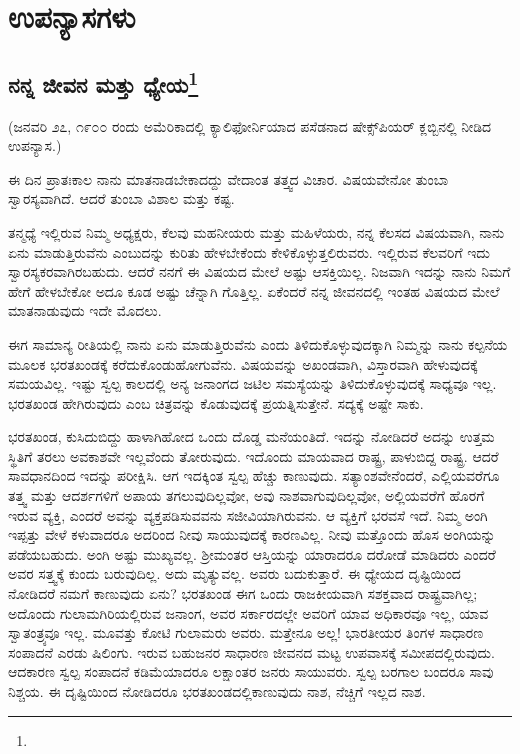 

\part{ಉಪನ್ಯಾಸಗಳು}

\chapter[ನನ್ನ ಜೀವನ ಮತ್ತು ಧ್ಯೇಯ]{ನನ್ನ ಜೀವನ ಮತ್ತು ಧ್ಯೇಯ\protect\footnote{}}

\begin{center}
(ಜನವರಿ ೨೭, ೧೯೦೦ ರಂದು ಅಮೆರಿಕಾದಲ್ಲಿ ಕ್ಯಾಲಿಫೋರ್ನಿಯಾದ ಪಸೆಡನಾದ ಷೇಕ್ಸ್‌ಪಿಯರ್ ಕ್ಲಬ್ಬಿನಲ್ಲಿ ನೀಡಿದ ಉಪನ್ಯಾಸ.)
\end{center}

ಈ ದಿನ ಪ್ರಾತಃಕಾಲ ನಾನು ಮಾತನಾಡಬೇಕಾದದ್ದು ವೇದಾಂತ ತತ್ತ್ವದ ವಿಚಾರ. ವಿಷಯವೇನೋ ತುಂಬಾ ಸ್ವಾರಸ್ಯವಾಗಿದೆ. ಆದರೆ ತುಂಬಾ ವಿಶಾಲ ಮತ್ತು ಕಷ್ಟ.

ತನ್ಮಧ್ಯೆ ಇಲ್ಲಿರುವ ನಿಮ್ಮ ಅಧ್ಯಕ್ಷರು, ಕೆಲವು ಮಹನೀಯರು ಮತ್ತು ಮಹಿಳೆಯರು, ನನ್ನ ಕೆಲಸದ ವಿಷಯವಾಗಿ, ನಾನು ಏನು ಮಾಡುತ್ತಿರುವೆನು ಎಂಬುದನ್ನು ಕುರಿತು ಹೇಳಬೇಕೆಂದು ಕೇಳಿಕೊಳ್ಳುತ್ತಲಿರುವರು. ಇಲ್ಲಿರುವ ಕೆಲವರಿಗೆ ಇದು ಸ್ವಾರಸ್ಯಕರವಾಗಿರಬಹುದು. ಆದರೆ ನನಗೆ ಈ ವಿಷಯದ ಮೇಲೆ ಅಷ್ಟು ಆಸಕ್ತಿಯಿಲ್ಲ. ನಿಜವಾಗಿ ಇದನ್ನು ನಾನು ನಿಮಗೆ ಹೇಗೆ ಹೇಳಬೇಕೋ ಅದೂ ಕೂಡ ಅಷ್ಟು ಚೆನ್ನಾಗಿ ಗೊತ್ತಿಲ್ಲ. ಏಕೆಂದರೆ ನನ್ನ ಜೀವನದಲ್ಲಿ ಇಂತಹ ವಿಷಯದ ಮೇಲೆ ಮಾತನಾಡುವುದು ಇದೇ ಮೊದಲು.

ಈಗ ಸಾಮಾನ್ಯ ರೀತಿಯಲ್ಲಿ ನಾನು ಏನು ಮಾಡುತ್ತಿರುವೆನು ಎಂದು ತಿಳಿದುಕೊಳ್ಳುವುದಕ್ಕಾಗಿ ನಿಮ್ಮನ್ನು ನಾನು ಕಲ್ಪನೆಯ ಮೂಲಕ ಭರತಖಂಡಕ್ಕೆ ಕರೆದುಕೊಂಡು\break ಹೋಗುವೆನು. ವಿಷಯವನ್ನು ಅಖಂಡವಾಗಿ, ವಿಸ್ತಾರವಾಗಿ ಹೇಳುವುದಕ್ಕೆ ಸಮಯವಿಲ್ಲ. ಇಷ್ಟು ಸ್ವಲ್ಪ ಕಾಲದಲ್ಲಿ ಅನ್ಯ ಜನಾಂಗದ ಜಟಿಲ ಸಮಸ್ಯೆಯನ್ನು ತಿಳಿದುಕೊಳ್ಳುವುದಕ್ಕೆ ಸಾಧ್ಯವೂ ಇಲ್ಲ. ಭರತಖಂಡ ಹೇಗಿರುವುದು ಎಂಬ ಚಿತ್ರವನ್ನು ಕೊಡುವುದಕ್ಕೆ ಪ್ರಯತ್ನಿಸುತ್ತೇನೆ. ಸದ್ಯಕ್ಕೆ ಅಷ್ಟೇ ಸಾಕು.

ಭರತಖಂಡ, ಕುಸಿದುಬಿದ್ದು ಹಾಳಾಗಿಹೋದ ಒಂದು ದೊಡ್ಡ ಮನೆಯಂತಿದೆ. ಇದನ್ನು ನೋಡಿದರೆ ಅದನ್ನು ಉತ್ತಮ ಸ್ಥಿತಿಗೆ ತರಲು ಅವಕಾಶವೇ ಇಲ್ಲವೆಂದು ತೋರುವುದು. ಇದೊಂದು ಮಾಯವಾದ ರಾಷ್ಟ್ರ, ಪಾಳುಬಿದ್ದ ರಾಷ್ಟ್ರ. ಆದರೆ ಸಾವಧಾನದಿಂದ ಇದನ್ನು ಪರೀಕ್ಷಿಸಿ. ಆಗ ಇದಕ್ಕಿಂತ ಸ್ವಲ್ಪ ಹೆಚ್ಚು ಕಾಣುವುದು. ಸತ್ಯಾಂಶವೇನೆಂದರೆ, ಎಲ್ಲಿಯವರೆಗೂ ತತ್ತ್ವ ಮತ್ತು ಆದರ್ಶಗಳಿಗೆ ಅಪಾಯ ತಗಲುವುದಿಲ್ಲವೋ, ಅವು ನಾಶವಾಗುವುದಿಲ್ಲವೋ, ಅಲ್ಲಿಯವರೆಗೆ ಹೊರಗೆ ಇರುವ ವ್ಯಕ್ತಿ, ಎಂದರೆ ಅವನ್ನು ವ್ಯಕ್ತಪಡಿಸುವವನು ಸಜೀವಿಯಾಗಿರುವನು. ಆ ವ್ಯಕ್ತಿಗೆ ಭರವಸೆ ಇದೆ. ನಿಮ್ಮ ಅಂಗಿ ಇಪ್ಪತ್ತು ವೇಳೆ ಕಳುವಾದರೂ ಅದರಿಂದ ನೀವು ಸಾಯುವುದಕ್ಕೆ ಕಾರಣವಿಲ್ಲ. ನೀವು ಮತ್ತೊಂದು ಹೊಸ ಅಂಗಿಯನ್ನು ಪಡೆಯಬಹುದು. ಅಂಗಿ ಅಷ್ಟು ಮುಖ್ಯವಲ್ಲ. ಶ‍್ರೀಮಂತರ ಆಸ್ತಿಯನ್ನು ಯಾರಾದರೂ ದರೋಡೆ ಮಾಡಿದರು ಎಂದರೆ ಅವರ ಸತ್ತ್ವಕ್ಕೆ ಕುಂದು ಬರುವುದಿಲ್ಲ. ಅದು ಮೃತ್ಯುವಲ್ಲ. ಅವರು ಬದುಕುತ್ತಾರೆ. ಈ ಧ್ಯೇಯದ ದೃಷ್ಟಿಯಿಂದ ನೋಡಿದರೆ ನಮಗೆ ಕಾಣುವುದು ಏನು? ಭರತಖಂಡ ಈಗ ಒಂದು ರಾಜಕೀಯವಾಗಿ ಸಶಕ್ತವಾದ ರಾಷ್ಟ್ರವಾಗಿಲ್ಲ; ಅದೊಂದು ಗುಲಾಮಗಿರಿಯಲ್ಲಿರುವ ಜನಾಂಗ, ಅವರ ಸರ್ಕಾರದಲ್ಲೇ ಅವರಿಗೆ ಯಾವ ಅಧಿಕಾರವೂ ಇಲ್ಲ, ಯಾವ ಸ್ವಾತಂತ್ರ್ಯವೂ ಇಲ್ಲ. ಮೂವತ್ತು ಕೋಟಿ ಗುಲಾಮರು ಅವರು. ಮತ್ತೇನೂ ಅಲ್ಲ! ಭಾರತೀಯರ ತಿಂಗಳ ಸಾಧಾರಣ ಸಂಪಾದನೆ ಎರಡು ಷಿಲಿಂಗು. ಇರುವ ಬಹುಜನರ ಸಾಧಾರಣ ಜೀವನದ ಮಟ್ಟ ಉಪವಾಸಕ್ಕೆ ಸಮೀಪದಲ್ಲಿರುವುದು. ಆದಕಾರಣ ಸ್ವಲ್ಪ ಸಂಪಾದನೆ ಕಡಿಮೆಯಾದರೂ ಲಕ್ಷಾಂತರ ಜನರು ಸಾಯುವರು. ಸ್ವಲ್ಪ ಬರಗಾಲ ಬಂದರೂ ಸಾವು ನಿಶ್ಚಯ. ಈ ದೃಷ್ಟಿಯಿಂದ ನೋಡಿದರೂ ಭರತಖಂಡದಲ್ಲಿ\break ಕಾಣುವುದು ನಾಶ, ನೆಚ್ಚಿಗೆ ಇಲ್ಲದ ನಾಶ.

